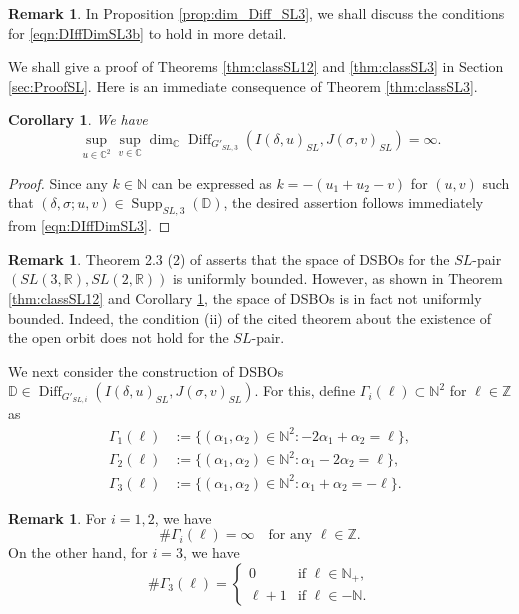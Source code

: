\documentclass[a4paper,11pt,reqno]{amsart}
\newcommand{\DD}{\mathbb{D}}
\newcommand{\0}{{\bf 0}}
\newcommand{\N}{\mathbb{N}}
\newcommand{\Z}{\mathbb{Z}}
\newcommand{\R}{\mathbb{R}}
\newcommand{\C}{\mathbb{C}}
\newcommand{\1}{{\bf 1}}
\DeclareMathOperator{\Supp}{Supp}
\DeclareMathOperator{\Diff}{Diff}
\theoremstyle{plain}
\newtheorem{corollary}[equation]{Corollary}
\theoremstyle{definition}
\newtheorem{remark}[equation]{Remark}
\numberwithin{equation}{section}
\theoremstyle{definition}
\begin{document}
\begin{remark}
In Proposition \ref{prop:dim_Diff_SL3}, 
we shall discuss the conditions for \eqref{eqn:DIffDimSL3b} to hold in more detail.
\end{remark}

We shall give a proof of Theorems \ref{thm:classSL12} and \ref{thm:classSL3} 
in Section \ref{sec:ProofSL}. 
Here is an immediate consequence of Theorem \ref{thm:classSL3}.

\begin{corollary}\label{cor:DiffDimSL3}
We have 
\begin{equation*}
\sup_{u\in \C^2}\sup_{v \in \C}
\dim_\C\Diff_{G'_{SL,3}}(I(\delta,u)_{SL}, J(\sigma,v)_{SL}) =\infty.
\end{equation*}
\end{corollary}

\begin{proof}
Since any $ k \in \N$ can be expressed as 
$k=-(u_1+u_2-v)$ for $(u,v)$ such that $(\delta,\sigma; u, v) \in \Supp_{SL,3}(\DD)$,
the desired assertion follows immediately from 
\eqref{eqn:DIffDimSL3}.
\end{proof}

\begin{remark}
Theorem 2.3 (2) of \cite{Kobayashi14} asserts that 
the space of DSBOs for the $SL$-pair
$(SL(3,\R), SL(2,\R))$
is uniformly bounded.
However, as shown in Theorem \ref{thm:classSL12} and 
Corollary \ref{cor:DiffDimSL3}, the space of DSBOs is in fact
not uniformly bounded. Indeed, the condition (ii) of the cited theorem
about the existence of the open orbit does not hold for the $SL$-pair.
\end{remark}

We next consider the construction of DSBOs
$\DD \in \Diff_{G'_{SL,i}}(I(\delta,u)_{SL}, J(\sigma,v)_{SL})$.
For this, define $\Gamma_i(\ell) \subset \N^2$ for $ \ell \in \Z$ as 
\begin{align}\label{eqn:Gamma_ell}
\Gamma_1(\ell)&:=\{(\alpha_1,\alpha_2) \in \N^2: -2\alpha_1+\alpha_2=\ell\},
\nonumber\\[3pt]
\Gamma_2(\ell)&:=\{(\alpha_1,\alpha_2) \in \N^2: \alpha_1-2\alpha_2=\ell\},\\[3pt]
\Gamma_3(\ell)&:=\{(\alpha_1,\alpha_2) \in \N^2: \alpha_1+\alpha_2=-\ell\}.
\nonumber
\end{align}

\begin{remark}\label{rem:GammaSL}
For $i=1,2$, we have 
\begin{equation}\label{eqn:GammaSL12}
\#\Gamma_i(\ell)=\infty \quad \text{for any $\ell \in \Z$}.
\end{equation}
On the other hand, for $i=3$, we have
\begin{equation}\label{eqn:GammaSL3}
\#\Gamma_3(\ell)=
\begin{cases}
0  &\text{if $\ell \in \N_+$},\\
\ell+1  &\text{if $\ell \in -\N$}.
\end{cases}
\end{equation}
\end{remark}
\end{document}
